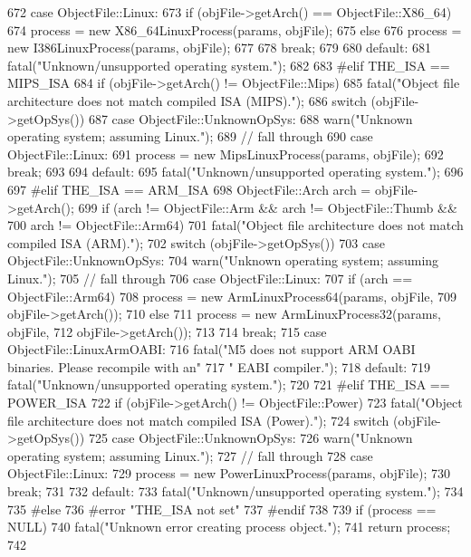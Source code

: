 \begin{DoxyCode}
{{672       case ObjectFile::Linux:
673         if (objFile->getArch() == ObjectFile::X86_64) {
674             process = new X86_64LinuxProcess(params, objFile);
675         } else {
676             process = new I386LinuxProcess(params, objFile);
677         }
678         break;
679 
680       default:
681         fatal("Unknown/unsupported operating system.");
682     }
683 #elif THE_ISA == MIPS_ISA
684     if (objFile->getArch() != ObjectFile::Mips)
685         fatal("Object file architecture does not match compiled ISA (MIPS).");
686     switch (objFile->getOpSys()) {
687       case ObjectFile::UnknownOpSys:
688         warn("Unknown operating system; assuming Linux.");
689         // fall through
690       case ObjectFile::Linux:
691         process = new MipsLinuxProcess(params, objFile);
692         break;
693 
694       default:
695         fatal("Unknown/unsupported operating system.");
696     }
697 #elif THE_ISA == ARM_ISA
698     ObjectFile::Arch arch = objFile->getArch();
699     if (arch != ObjectFile::Arm && arch != ObjectFile::Thumb &&
700         arch != ObjectFile::Arm64)
701         fatal("Object file architecture does not match compiled ISA (ARM).");
702     switch (objFile->getOpSys()) {
703       case ObjectFile::UnknownOpSys:
704         warn("Unknown operating system; assuming Linux.");
705         // fall through
706       case ObjectFile::Linux:
707         if (arch == ObjectFile::Arm64) {
708             process = new ArmLinuxProcess64(params, objFile,
709                                             objFile->getArch());
710         } else {
711             process = new ArmLinuxProcess32(params, objFile,
712                                             objFile->getArch());
713         }
714         break;
715       case ObjectFile::LinuxArmOABI:
716         fatal("M5 does not support ARM OABI binaries. Please recompile with an"
717               " EABI compiler.");
718       default:
719         fatal("Unknown/unsupported operating system.");
720     }
721 #elif THE_ISA == POWER_ISA
722     if (objFile->getArch() != ObjectFile::Power)
723         fatal("Object file architecture does not match compiled ISA (Power).");
724     switch (objFile->getOpSys()) {
725       case ObjectFile::UnknownOpSys:
726         warn("Unknown operating system; assuming Linux.");
727         // fall through
728       case ObjectFile::Linux:
729         process = new PowerLinuxProcess(params, objFile);
730         break;
731 
732       default:
733         fatal("Unknown/unsupported operating system.");
734     }
735 #else
736 #error "THE_ISA not set"
737 #endif
738 
739     if (process == NULL)
740         fatal("Unknown error creating process object.");
741     return process;
742 }
\end{DoxyCode}

